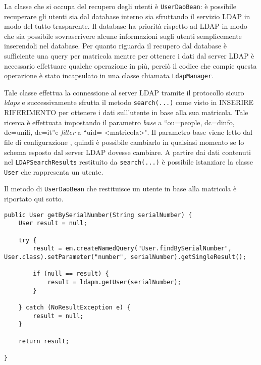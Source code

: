 La classe che si occupa del recupero degli utenti è \texttt{UserDaoBean}: è possibile recuperare gli utenti sia dal database interno sia sfruttando il servizio LDAP in modo del tutto trasparente.
Il database ha priorità rispetto ad LDAP in modo che sia possibile sovrascrivere alcune informazioni sugli utenti semplicemente inserendoli nel database. Per quanto riguarda il recupero dal database è sufficiente una query per matricola 
mentre per ottenere i dati dal server LDAP è necessario effettuare qualche operazione in più, perciò il codice che compie questa operazione è stato incapsulato in una classe chiamata \texttt{LdapManager}.

Tale classe effettua la connessione al server LDAP tramite il protocollo sicuro \textsl{ldaps} e successivamente sfrutta il metodo \texttt{search(...)} come visto in INSERIRE RIFERIMENTO per ottenere i dati sull'utente in base alla sua matricola.
Tale ricerca è effettuata impostando il parametro \textsl{base} a ``ou=people, dc=dinfo, dc=unifi, dc=it''e \textsl{filter} a ``uid= \textless matricola\textgreater{}". Il parametro base viene letto dal file di configurazione 
, quindi è possibile cambiarlo in qualsiasi momento se lo schema esposto dal server LDAP dovesse cambiare.
A partire dai dati contenuti nel \texttt{LDAPSearchResults} restituito da \texttt{search(...)} è possibile istanziare la classe \texttt{User} che rappresenta un utente.

Il metodo di \texttt{UserDaoBean} che restituisce un utente in base alla matricola è riportato qui sotto.

\begin{lstlisting}
public User getBySerialNumber(String serialNumber) {
	User result = null;
	
	try {
		result = em.createNamedQuery("User.findBySerialNumber", User.class).setParameter("number", serialNumber).getSingleResult();
		
		if (null == result) {
			result = ldapm.getUser(serialNumber);
		}
		
	} catch (NoResultException e) {
		result = null;
	}

	return result;

}
\end{lstlisting}



